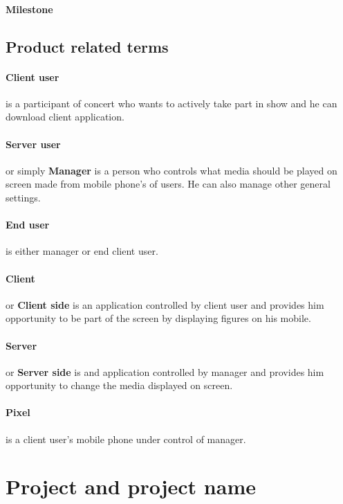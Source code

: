 \paragraph{Milestone}

\subsection{Product related terms}
\paragraph{Client user}
is a participant of concert who wants to actively take part in show and he can download client application.

\paragraph{Server user}
or simply \textbf{Manager} is a person who controls what media should be played on screen made from mobile phone's of users. 
He can also manage other general settings.

\paragraph{End user} is either manager or end client user.

\paragraph{Client} or \textbf{Client side} is an application controlled by client user and provides him opportunity to be part of the screen by displaying figures on his mobile.

\paragraph{Server} or \textbf{Server side} is and application controlled by manager and provides him opportunity to change the media displayed on screen.

\paragraph{Pixel} is a client user's mobile phone under control of manager.


\section{Project and project name}

